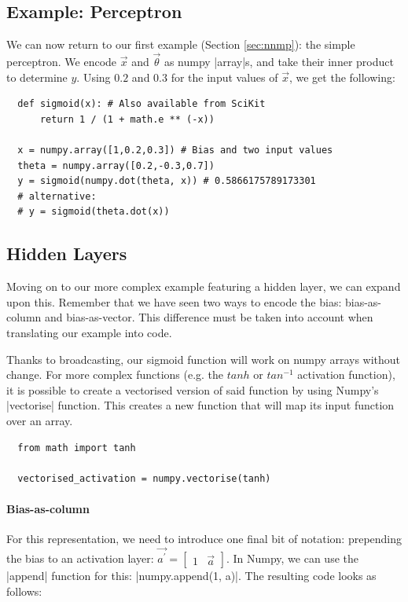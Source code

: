 \subsection{Example: Perceptron}
We can now return to our first example (Section \ref{sec:nnmp}): the simple perceptron. We encode $\vec x$ and $\vec \theta$ as numpy \py|array|s, and take their inner product to determine $y$. Using $0.2$ and $0.3$ for the input values of $\vec x$, we get the following:

\begin{lstlisting}
  def sigmoid(x): # Also available from SciKit
      return 1 / (1 + math.e ** (-x))

  x = numpy.array([1,0.2,0.3]) # Bias and two input values
  theta = numpy.array([0.2,-0.3,0.7])
  y = sigmoid(numpy.dot(theta, x)) # 0.5866175789173301
  # alternative:
  # y = sigmoid(theta.dot(x))
\end{lstlisting}

\subsection{Hidden Layers}
Moving on to our more complex example featuring a hidden layer, we can expand upon this. Remember that we have seen two ways to encode the bias: bias-as-column and bias-as-vector. This difference must be taken into account when translating our example into code.

Thanks to broadcasting, our sigmoid function will work on numpy arrays without change. For more complex functions (e.g. the $tanh$ or $tan^{-1}$ activation function), it is possible to create a vectorised version of said function by using Numpy's \py|vectorise| function. This creates a new function that will map its input function over an array.

\begin{lstlisting}
  from math import tanh

  vectorised_activation = numpy.vectorise(tanh)
\end{lstlisting}

\paragraph{Bias-as-column}
For this representation, we need to introduce one final bit of notation: prepending the bias to an activation layer: $\vec{a^\prime} = \begin{bmatrix} 1 & \vec{a}\end{bmatrix}$. In Numpy, we can use the \py|append| function for this: \py|numpy.append(1, a)|. The resulting code looks as follows:

